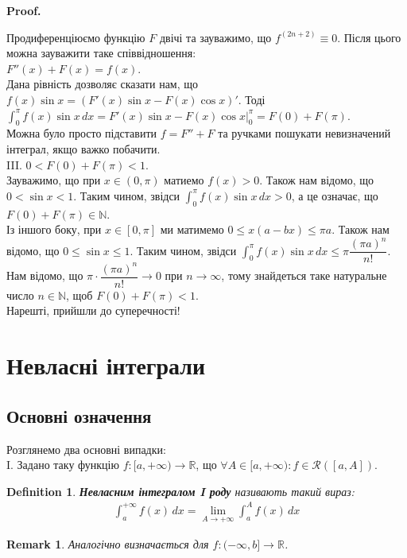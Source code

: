 \documentclass[a4paper, 10pt]{article}
\makeatletter
\def\qed{$\blacksquare$}
\theoremstyle{theoremdd}
\theoremstyle{theoremdd}
\theoremstyle{theoremdd}
\newtheorem{definition}[theorem]{Definition}
\theoremstyle{theoremdd}
\theoremstyle{theoremdd}
\theoremstyle{theoremdd}
\theoremstyle{theoremdd}
\newtheorem{remark}[theorem]{Remark}
\theoremstyle{theoremdd}
\theoremstyle{theoremdd}
\renewenvironment{proof}[1][Proof.\\]{\par
\pushQED{\hfill \qed}%
\normalfont \topsep6\p@\@plus6\p@\relax
\trivlist
\item\relax
{\bfseries
#1\@addpunct{.}}\hspace\labelsep\ignorespaces
}{%
\popQED\endtrivlist\@endpefalse
}
\makeatother
\begin{document}
\begin{proof}
Продиференціюємо функцію $F$ двічі та зауважимо, що $f^{(2n+2)} \equiv 0$. Після цього можна зауважити таке співвідношення:\\
$F''(x) + F(x) = f(x)$.\\
Дана рівність дозволяє сказати нам, що $f(x) \sin x = (F'(x) \sin x - F(x) \cos x)'$. Тоді\\
$\displaystyle\int_0^{\pi} f(x)\sin x\,dx = F'(x) \sin x - F(x) \cos x \Big|_{0}^{\pi} = F(0) + F(\pi)$.\\
Можна було просто підставити $f = F'' + F$ та ручками пошукати невизначений інтеграл, якщо важко побачити.
\bigskip \\
III. \textit{$0 < F(0) + F(\pi) < 1$}.\\
Зауважимо, що при $x \in (0,\pi)$ матиемо $f(x) > 0$. Також нам відомо, що $0 < \sin x < 1$. Таким чином, звідси $\displaystyle\int_0^{\pi} f(x) \sin x\,dx > 0$, а це означає, що $F(0) + F(\pi) \in \mathbb{N}$.\\
Із іншого боку, при $x \in [0,\pi]$ ми матимемо $0 \leq x(a-bx) \leq \pi a$. Також нам відомо, що $0 \leq \sin x \leq 1$. Таким чином, звідси $\displaystyle\int_0^{\pi} f(x) \sin x\,dx \leq \pi \dfrac{(\pi a)^n}{n!}$. Нам відомо, що $\pi \cdot \dfrac{(\pi a)^n}{n!} \to 0$ при $n \to \infty$, тому знайдеться таке натуральне число $n \in \mathbb{N}$, щоб $F(0) + F(\pi) < 1$.
\bigskip \\
Нарешті, прийшли до суперечності!
\end{proof}
\newpage

\section{Невласні інтеграли}
\subsection{Основні означення}
Розглянемо два основні випадки:\\
I. Задано таку функцію $f: [a,+\infty) \to \mathbb{R}$, що $\forall A \in [a,+\infty): f \in \mathcal{R}([a,A])$.
\begin{definition}
\textbf{Невласним інтегралом I роду} називають такий вираз:
\begin{align*}
\int_a^{+\infty} f(x)\,dx = \lim_{A \to +\infty} \int_a^A f(x)\,dx
\end{align*}
\end{definition}

\begin{remark}
Аналогічно визначається для $f: (-\infty,b] \to \mathbb{R}$.
\end{remark}
\end{document}
